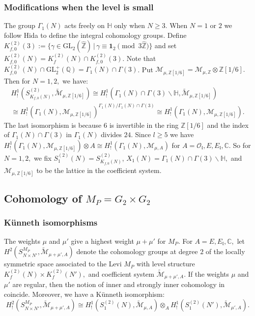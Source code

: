 \documentclass[11pt]{amsart}
\newcommand{\Z}{\mathbb Z}
\newcommand{\GL}{\mathrm{GL}}
\newcommand{\congf}[1]{K_f^{(2)}(#1)}
\begin{document}
\subsubsection{Modifications when the level is small}
 \label{section: modifications-when-the-level-is-small} 
 The group $\Gamma_1(N)$ acts freely on $\mathbb{H}$ only when $N\geq 3.$ 
 When $N=1 \text{ or }2$ we follow Hida \cite[Sect.\,5.3]{mfg} to define the integral cohomology groups. 
 Define $K^{(2)}_{f,0}(3) := \{\gamma \in \GL_2(\hat{\mathbb{Z}})\,|\, \gamma \equiv \mathbf{1}_2 \pmod{3 \hat{\mathbb{Z}}}\}$ and set 
 $K_{f,0}^{(2)}(N) = \congf{N} \cap K_{f,0}^{(2)}(3).$
Note that $K_{f,0}^{(2)}(N) \cap \GL^+_2(\mathbb{Q}) = \Gamma_1(N) \cap \Gamma(3)$. 
Put $\mathcal{M}_{\mu,\Z[1/6]} = \mathcal{M}_{\mu,\mathbb{Z}} \otimes \mathbb{Z}[1/6].$ Then for $N =1,2,$ we have:
\begin{multline*}
	H^1_!(S^{(2)}_{K_{f,0}(N)} , \widetilde{\mathcal{M}}_{\mu, \Z[1/6]}) \cong 
	H^1_!(\Gamma_1(N) \cap \Gamma(3) \backslash \mathbb{H}, \widetilde{\mathcal{M}}_{\mu, \Z[1/6]}) \\ \cong 
	H^1_!(\Gamma_1(N), \mathcal{M}_{\mu, \Z[1/6]})^{\Gamma_1(N)/ \Gamma_1(N) \cap \Gamma(3)} \cong 
	H^1_!(\Gamma_1(N), \mathcal{M}_{\mu, \Z[1/6]}).
\end{multline*}
The last isomorphism is because $6$ is invertible in the ring $\Z[1/6]$ and the index of 
$\Gamma_1(N) \cap \Gamma(3)$ in $\Gamma_1(N)$ divides $24$. Since $l \geq 5$ we have
$H_!^1(\Gamma_1(N), \mathcal{M}_{\mu,\Z[1/6]})\otimes A \cong H_!^1(\Gamma_1(N), \mathcal{M}_{\mu,A})$ for 
$A =  \mathcal{O}_\mathfrak{l}, E, E_\mathfrak{l}, \mathbb{C}.$ 
So for $N = 1, 2,$ we fix $S_1^{(2)}(N) = S^{(2)}_{K_{f,0}(N)}$, $X_1(N) = \Gamma_1(N) \cap \Gamma(3) \backslash \mathbb{H},$ and 
$\mathcal{M}_{\mu, \Z[1/6]}$ to be the lattice in the coefficient system. 

\medskip
\subsection{Cohomology of $M_P = G_2 \times G_2$}

\subsubsection{K\"unneth isomorphisms}
\label{sec:kunneth-levi}
The weights $\mu$ and $\mu'$ give a highest weight $\mu + \mu'$ for $M_P$. For $A= E, E_\mathfrak{l}, \mathbb{C},$ let $H^2(S^{M_P}_{N \times N'}, \widetilde{\mathcal{M}}_{\mu +\mu', A})$ 
 denote the cohomology groups at degree $2$ of the locally 
symmetric space associated to the Levi $M_P$ with level structure $\congf{N} \times \congf{N'},$
and coefficient system $\widetilde{\mathcal{M}}_{\mu +\mu', A}$. 
If the weights $\mu$ and $\mu'$ are regular, then the notion of inner and strongly inner cohomology in \cite{harder-raghuram} coincide. 
Moreover, we have a K\"unneth isomorphism: 
$$
H^2_{!}(S^{M_P}_{N \times N'}, \widetilde{\mathcal{M}}_{\mu +\mu', A}) \cong 
H^1_!(S_1^{(2)}(N), \widetilde{\mathcal{M}}_{\mu, A}) \otimes_A H^1_!(S_1^{(2)}(N'), \widetilde{\mathcal{M}}_{\mu', A}).
$$
\end{document}
